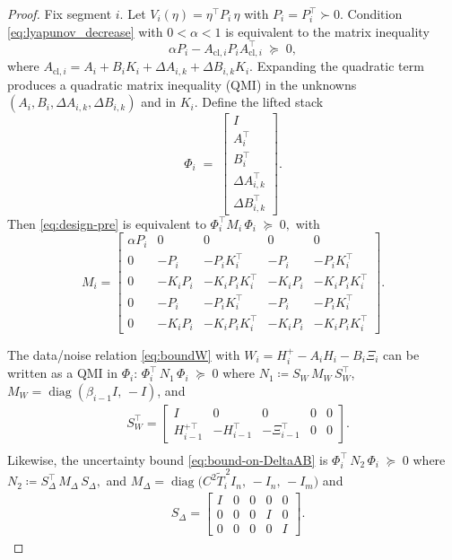 \documentclass[letterpaper, 10 pt, conference]{ieeeconf}
\DeclareMathOperator{\diag}{diag}
\begin{document}
\begin{proof}
Fix segment $i$. Let $V_i(\eta)=\eta^\top P_i\,\eta$ with $P_i=P_i^\top\succ0$.
Condition \eqref{eq:lyapunov_decrease} with $0<\alpha<1$ is equivalent to the matrix inequality
\begin{equation}\label{eq:design-pre}
\alpha P_i - A_{\mathrm{cl},i} P_i A_{\mathrm{cl},i}^\top \;\succeq\;0, 
\end{equation}
where $A_{\mathrm{cl},i}=A_{i}+B_{i}K_i+\Delta A_{i,k}+\Delta B_{i,k}K_i$. Expanding the quadratic term produces a quadratic matrix inequality (QMI) in the unknowns $(A_{i},B_{i},\Delta A_{i,k},\Delta B_{i,k})$ and in $K_i$. Define the lifted stack
\[
\Phi_i \;=\; \begin{bmatrix} I\\ A_{i}^\top\\ B_{i}^\top\\ \Delta A_{i,k}^\top\\ \Delta B_{i,k}^\top \end{bmatrix}.
\]
Then \eqref{eq:design-pre} is equivalent to $\Phi_i^\top M_i\,\Phi_i \;\succeq\; 0,$
with
\[
M_i=
\begin{bmatrix}
\alpha P_i & 0 & 0 & 0 & 0\\
0 & -P_i & -P_iK_i^\top & -P_i & -P_iK_i^\top\\
0 & -K_iP_i & -K_iP_iK_i^\top & -K_iP_i & -K_iP_iK_i^\top\\
0 & -P_i & -P_iK_i^\top & -P_i & -P_iK_i^\top\\
0 & -K_iP_i & -K_iP_iK_i^\top & -K_iP_i & -K_iP_iK_i^\top
\end{bmatrix}.
\]

The data/noise relation \eqref{eq:boundW} with
$W_i = H_i^{+} - A_{i} H_i - B_{i}\Xi_i$
can be written as a QMI in $\Phi_i$: $\Phi_i^\top\,N_1\,\Phi_i \;\succeq\; 0$ where $N_1 \coloneqq S_W\,M_W\,S_W^\top$, $M_W=\diag(\beta_{i-1} I,\,-I)$, and
\begin{align*}
    &S_W^\top =
\begin{bmatrix}
I & 0 & 0 & 0 & 0\\
H_{i-1}^{+\top} & -H_{i-1}^\top & -\Xi_{i-1}^\top & 0 & 0
\end{bmatrix}.\\
\end{align*}
Likewise, the uncertainty bound \eqref{eq:bound-on-DeltaAB} is $\Phi_i^\top\,N_2\,\Phi_i \;\succeq\; 0$ where $N_2 \coloneqq S_\Delta^\top\,M_\Delta\,S_\Delta,$
and $M_\Delta=\diag\!\big(C^2\widetilde T_i^{\,2} I_n,\,-I_n,\,-I_m\big)$ and
\begin{align*}
    &S_\Delta =
\begin{bmatrix}
I & 0 & 0 & 0 & 0\\
0 & 0 & 0 & I & 0\\
0 & 0 & 0 & 0 & I
\end{bmatrix}.
\end{align*}


\end{proof}
\end{document}
